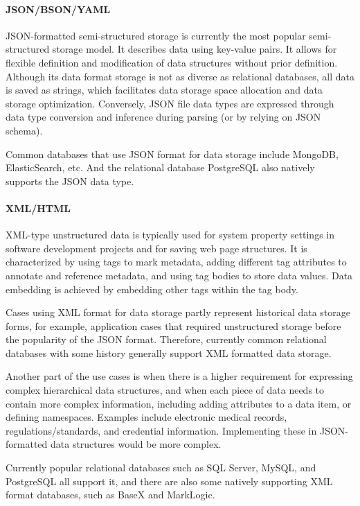 \documentclass{article}
\begin{document}
\paragraph{JSON/BSON/YAML} 
JSON-formatted semi-structured storage is currently the most popular semi-structured storage model. It describes data using key-value pairs. It allows for flexible definition and modification of data structures without prior definition. Although its data format storage is not as diverse as relational databases, all data is saved as strings, which facilitates data storage space allocation and data storage optimization.
Conversely, JSON file data types are expressed through data type conversion and inference during parsing (or by relying on JSON schema).

Common databases that use JSON format for data storage include MongoDB, ElasticSearch, etc. And the relational database PostgreSQL also natively supports the JSON data type.

\paragraph{XML/HTML} 
XML-type unstructured data is typically used for system property settings in software development projects and for saving web page structures. It is characterized by using tags to mark metadata, adding different tag attributes to annotate and reference metadata, and using tag bodies to store data values.
Data embedding is achieved by embedding other tags within the tag body.

Cases using XML format for data storage partly represent historical data storage forms, for example, application cases that required unstructured storage before the popularity of the JSON format. Therefore, currently common relational databases with some history generally support XML formatted data storage.

Another part of the use cases is when there is a higher requirement for expressing complex hierarchical data structures, and when each piece of data needs to contain more complex information, including adding attributes to a data item, or defining namespaces. Examples include electronic medical records, regulations/standards, and credential information. Implementing these in JSON-formatted data structures would be more complex.

Currently popular relational databases such as SQL Server, MySQL, and PostgreSQL all support it, and there are also some natively supporting XML format databases, such as BaseX and MarkLogic.
\end{document}
